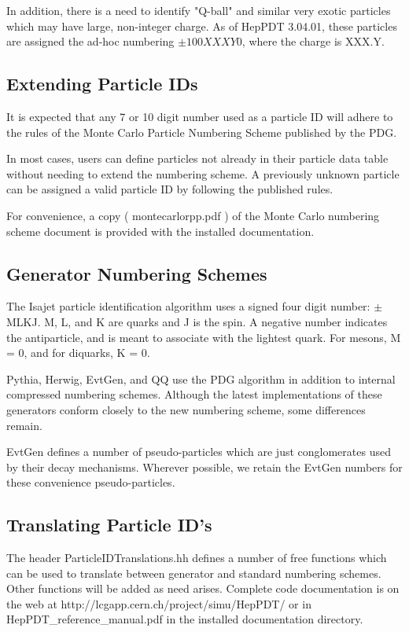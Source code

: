 In addition, there is a need to identify "Q-ball" and similar 
very exotic particles which may have large, non-integer charge.
As of HepPDT 3.04.01, these particles are assigned the ad-hoc numbering
$\pm 100XXXY0$, where the charge is XXX.Y.


\subsection { Extending Particle IDs }
\label{pid}

It is expected that any 7 or 10 digit number used as a particle ID will 
adhere to the rules of the Monte Carlo Particle Numbering Scheme 
published by the PDG.\cite{pdg}

In most cases, users can define particles not already in their
particle data table without needing to extend the numbering scheme.
A previously unknown particle can be assigned a valid particle ID by
following the published rules.\cite{scheme}

For convenience, a copy ( montecarlorpp.pdf ) of the Monte Carlo numbering 
scheme document is provided with the installed documentation.

\subsection { Generator Numbering Schemes }

The Isajet particle identification algorithm uses a signed four digit
number: $\pm$MLKJ.  M, L, and K are quarks and J is the spin.  A negative
number indicates the antiparticle, and is meant to associate with the
lightest quark.  For mesons, M = 0, and for diquarks, K = 0.

Pythia, Herwig, EvtGen, and QQ use the PDG algorithm in addition to internal
compressed numbering schemes.
Although the latest implementations of these generators conform closely
to the new numbering scheme, some differences remain.

EvtGen defines a number of pseudo-particles which are just 
conglomerates used by their decay mechanisms.  
Wherever possible, we retain the 
EvtGen numbers for these convenience pseudo-particles.

\subsection { Translating Particle ID's }

The header ParticleIDTranslations.hh defines a number of free functions 
which can be used to translate between generator and standard numbering schemes.
Other functions will be added as need arises.  
Complete code documentation is
on the web at http://lcgapp.cern.ch/project/simu/HepPDT/
or in HepPDT\_reference\_manual.pdf in the installed documentation directory. 

